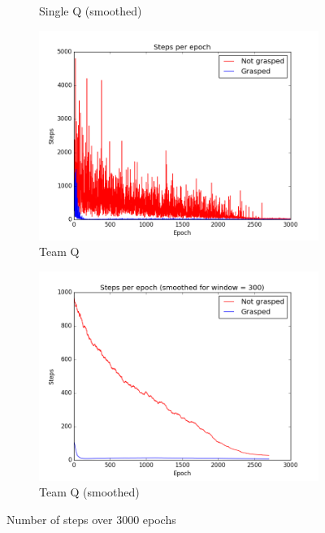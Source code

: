 \begin{figure}
\begin{subfigure}{0.48\textwidth}
		\caption{Single Q (smoothed)}
	\end{subfigure}
	\begin{subfigure}{.48\textwidth}
		\centering
		\includegraphics[width=\textwidth]{images/TeamQ.png}
		\caption{Team Q}
	\end{subfigure}
	\begin{subfigure}{0.48\textwidth}
		\centering
		\includegraphics[width=\textwidth]{images/TeamQ_smoothed.png}
		\caption{Team Q (smoothed)}
	\end{subfigure}
	\caption{Number of steps over 3000 epochs}
	\label{fig:Results1}
\end{figure}


